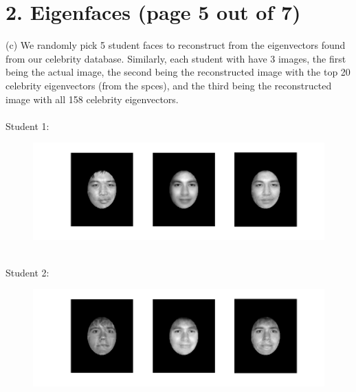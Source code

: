\documentclass[11pt]{article}
\begin{document}
\section*{2. Eigenfaces (page 5 out of 7)}
(c) We randomly pick 5 student faces to reconstruct from the eigenvectors found from our celebrity database. Similarly, each student with have 3 images, the first being the actual image, the second being the reconstructed image with the top 20 celebrity eigenvectors (from the spces), and the third being the reconstructed image with all 158 celebrity eigenvectors. \\\\
Student 1:
\begin{figure}[ht!]
\centering
\includegraphics[width=180mm]{images/student1.png}
\label{overflow}
\end{figure} \\
Student 2:
\begin{figure}[ht!]
\centering
\includegraphics[width=180mm]{images/student2.png}
\label{overflow}
\end{figure}
\newpage
\end{document}
